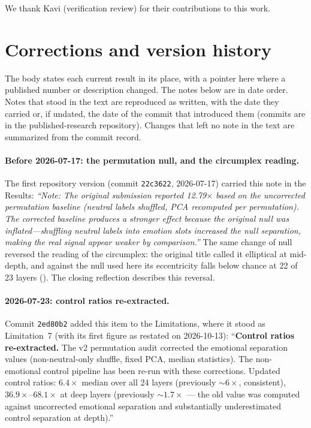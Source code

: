 \documentclass[11pt,a4paper]{article}
\begin{document}
We thank Kavi (verification review) for their contributions to this work.


\appendix

\section{Corrections and version history}
\label{sec:corrections}

The body states each current result in its place, with a pointer here
where a published number or description changed. The notes below are in
date order. Notes that stood in the text are reproduced as written, with
the date they carried or, if undated, the date of the commit that
introduced them (commits are in the published-research repository).
Changes that left no note in the text are summarized from the commit
record.

\paragraph{Before 2026-07-17: the permutation null, and the circumplex reading.}
The first repository version (commit \texttt{22c3622}, 2026-07-17) carried
this note in the Results: \emph{``Note: The original submission reported
12.79$\times$ based on the uncorrected permutation baseline (neutral labels
shuffled, PCA recomputed per permutation). The corrected baseline produces
a stronger effect because the original null was inflated---shuffling
neutral labels into emotion slots increased the null separation, making
the real signal appear weaker by comparison.''} The same change of null
reversed the reading of the circumplex: the original title called it
elliptical at mid-depth, and against the null used here its eccentricity
falls below chance at 22 of 23 layers (). The
closing reflection describes this reversal.

\paragraph{2026-07-23: control ratios re-extracted.}
Commit \texttt{2ed80b2} added this item to the Limitations, where it stood
as Limitation~7 (with its first figure as restated on 2026-10-13):
``\textbf{Control ratios re-extracted.} The v2
permutation audit corrected the emotional separation values
(non-neutral-only shuffle, fixed PCA, median statistics). The
non-emotional control pipeline has been re-run with
these corrections. Updated control ratios: $6.4\times$
median over all 24 layers (previously ${\sim}6\times$, consistent),
$36.9\times$--$68.1\times$ at deep layers (previously
${\sim}1.7\times$ --- the old value was computed against
uncorrected emotional separation and substantially
underestimated control separation at depth).''
\end{document}
